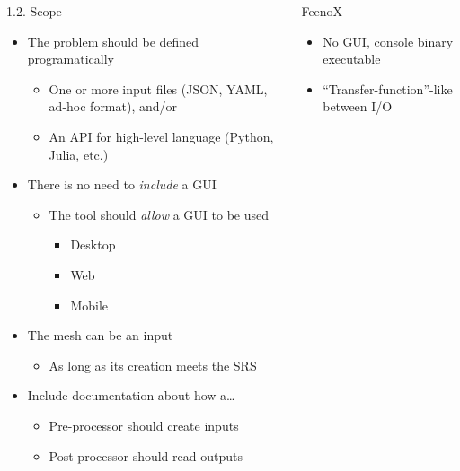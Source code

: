\documentclass[
  ignorenonframetext,
  aspectratio=169,
]{beamer}
\providecommand{\tightlist}{%
  \setlength{\itemsep}{0pt}\setlength{\parskip}{0pt}}
\begin{document}
\begin{frame}[fragile]{}
\protect\hypertarget{section-2}{}
\begin{columns}[T]
\begin{column}{0.5\textwidth}
\begin{block}{1.2. Scope}
\protect\hypertarget{scope}{}
\begin{itemize}
\tightlist
\item
  The problem should be defined programatically

  \begin{itemize}
  \tightlist
  \item
    One or more input files (JSON, YAML, ad-hoc format), and/or
  \item
    An API for high-level language (Python, Julia, etc.)
  \end{itemize}
\item
  There is no need to \emph{include} a GUI

  \begin{itemize}
  \tightlist
  \item
    The tool should \emph{allow} a GUI to be used

    \begin{itemize}
    \tightlist
    \item
      Desktop
    \item
      Web
    \item
      Mobile
    \end{itemize}
  \end{itemize}
\item
  The mesh can be an input

  \begin{itemize}
  \tightlist
  \item
    As long as its creation meets the SRS
  \end{itemize}
\item
  Include documentation about how a\ldots{}

  \begin{itemize}
  \tightlist
  \item
    Pre-processor should create inputs
  \item
    Post-processor should read outputs
  \end{itemize}
\end{itemize}
\end{block}
\end{column}

\pause

\begin{column}{0.5\textwidth}
\begin{exampleblock}{FeenoX}
\protect\hypertarget{feenox-1}{}
\begin{itemize}
\tightlist
\item
  No GUI, console binary executable
\item
  ``Transfer-function''-like between I/O


\end{itemize}
\end{exampleblock}
\end{column}
\end{columns}
\end{frame}
\end{document}
